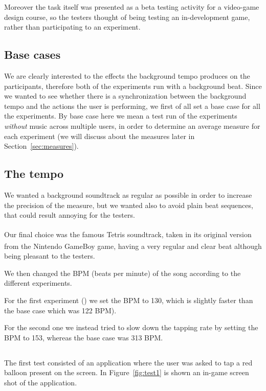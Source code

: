 Moreover the task itself was presented as a beta testing activity for a video-game design course, so the testers thought of being testing an in-development game, rather than participating to an experiment.

\subsection{Base cases}
\label{sec:basecases}
We are clearly interested to the effects the background tempo produces on the participants, therefore both of the experiments run with a background beat.
Since we wanted to see whether there is a synchronization between the background tempo and the actions the user is performing, we first of all set a base case for all the experiments.
By base case here we mean a test run of the experiments \emph{without} music across multiple users, in order to determine an average measure for each experiment (we will discuss about the measures later in Section~\ref{sec:measures}).

\subsection{The tempo}
We wanted a background soundtrack as regular as possible in order to increase the precision of the measure, but we wanted also to avoid plain beat sequences, that could result annoying for the testers.

Our final choice was the famous Tetris\textsuperscript{\texttrademark} soundtrack, taken in its original version from the Nintendo\textsuperscript{\texttrademark} GameBoy\textsuperscript{\texttrademark} game, having a very regular and clear beat although being pleasant to the testers.

We then changed the BPM (beats per minute) of the song according to the different experiments.

For the first experiment () we set the BPM to 130, which is slightly faster than the base case which was 122 BPM).

For the second one we instead tried to slow down the tapping rate by setting the BPM to 153, whereas the base case was 313 BPM.

\subsection{\testfirst}
\label{sec:test1}
The first test consisted of an application where the user was asked to tap a red balloon present on the screen. In Figure~\ref{fig:test1} is shown an in-game screen shot of the application.

